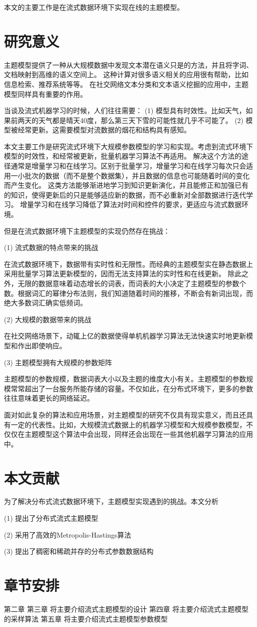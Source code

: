 本文的主要工作是在流式数据环境下实现在线的主题模型。

\section{研究意义}

主题模型提供了一种从大规模数据中发现文本潜在语义只是的方法，并且将字词、文档映射到高维的语义空间上。
这种计算对很多语义相关的应用很有帮助，比如信息检索、推荐系统等等。
在社交网络文本分类和文本语义挖掘的应用中，主题模型同样具有重要的作用。

当谈及流式机器学习的时候，人们往往需要：
(1) 模型具有时效性。比如天气，如果前两天的天气都是晴天40度，那么第三天下雪的可能性就几乎不可能了。
(2) 模型被经常更新。这需要模型对流数据的烟花和结构具有感知。

本文主要工作是研究流式环境下大规模参数模型的学习和实现。考虑到流式环境下模型的时效性，和经常被更新，批量机器学习算法不再适用。
解决这个方法的途径通常是增量学习和在线学习。区别于批量学习，增量学习和在线学习每次只会适用一小批次的数据（而不是整个数据集），并且数据的信息也可能随着时间的变化而产生变化。
这类方法能够渐进地学习到知识更新演化，并且能修正和加强已有的知识，使得更新后的只是能够适应新的数据，而不必重新对全部数据进行迭代学习。
增量学习和在线学习降低了算法对时间和控件的要求，更适应与流式数据环境。

但是在流式数据环境下主题模型的实现仍然存在挑战：

(1) 流式数据的特点带来的挑战

在流式数据环境下，数据带有实时性和无限性。而经典的主题模型实在静态数据上采用批量学习算法更新模型的，因而无法支持算法的实时性和在线更新。
除此之外，无限的数据意味着动态增长的词表，而词表的大小决定了主题模型的参数个数。根据词汇的幂律分布法则，我们知道随着时间的推移，不断会有新词出现，而绝大多数词汇确实低频词。

(2) 大规模的数据带来的挑战

在社交网络场景下，动辄上亿的数据使得单机机器学习算法无法快速实时地更新模型和作出即使响应。

(3) 主题模型拥有大规模的参数矩阵

主题模型的参数规模，数据词表大小以及主题的维度大小有关。主题模型的参数规模常常超出了一台服务所能存储的容量。不仅如此，在分布式环境下，更多的参数往往意味着更长的网络延迟。

面对如此复杂的算法和应用场景，对主题模型的研究不仅具有现实意义，而且还具有一定的代表性。比如，大规模流式数据上的机器学习模型和大规模参数模型，不仅仅在主题模型这个算法中会出现，同样还会出现在一些其他机器学习算法的应用中。

\section{本文贡献}
为了解决分布式流式数据环境下，主题模型实现遇到的挑战。本文分析

(1) 提出了分布式流式主题模型

(2) 采用了高效的Metropolis-Hastings算法

(3) 提出了稠密和稀疏并存的分布式参数数据结构


\section{章节安排}
第二章
第三章 将主要介绍流式主题模型的设计
第四章 将主要介绍流式主题模型的采样算法
第五章 将主要介绍流式主题模型参数模型
